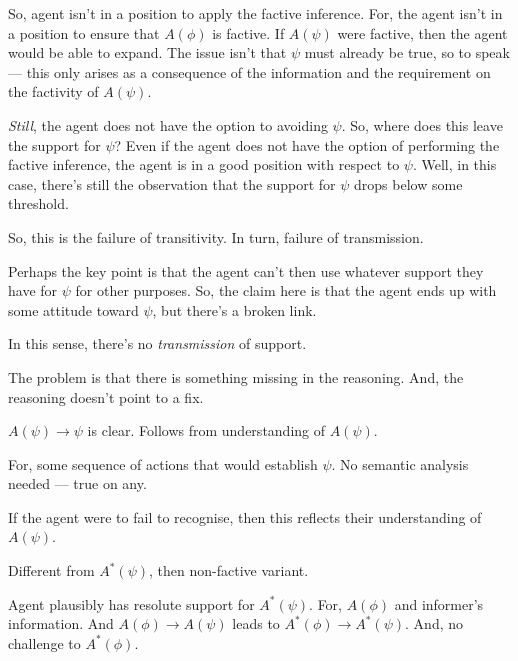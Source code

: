 \documentclass[10pt]{article}
\begin{document}
\begin{note}
  So, agent isn't in a position to apply the factive inference.
  For, the agent isn't in a position to ensure that \(A(\phi)\) is factive.
  If \(A(\psi)\) were factive, then the agent would be able to expand.
  The issue isn't that \(\psi\) must already be true, so to speak --- this only arises as a consequence of the information and the requirement on the factivity of \(A(\psi)\).

  \emph{Still}, the agent does not have the option to avoiding \(\psi\).
  So, where does this leave the support for \(\psi\)?
  Even if the agent does not have the option of performing the factive inference, the agent is in a good position with respect to \(\psi\).
  Well, in this case, there's still the observation that the support for \(\psi\) drops below some threshold.

  So, this is the failure of transitivity.
  In turn, failure of transmission.

  Perhaps the key point is that the agent can't then use whatever support they have for \(\psi\) for other purposes.
  So, the claim here is that the agent ends up with some attitude toward \(\psi\), but there's a broken link.

  In this sense, there's no \emph{transmission} of support.

  The problem is that there is something missing in the reasoning.
  And, the reasoning doesn't point to a fix.
\end{note}

\begin{note}
  \(A(\psi) \rightarrow \psi\) is clear.
  Follows from understanding of \(A(\psi)\).

  For, some sequence of actions that would establish \(\psi\).
  No semantic analysis needed --- true on any.

  If the agent were to fail to recognise, then this reflects their understanding of \(A(\psi)\).

  Different from \(A^{*}(\psi)\), then non-factive variant.

  Agent plausibly has resolute support for \(A^{*}(\psi)\).
  For, \(A(\phi)\) and informer's information.
  And \(A(\phi) \rightarrow A(\psi)\) leads to \(A^{*}(\phi) \rightarrow A^{*}(\psi)\).
  And, no challenge to \(A^{*}(\phi)\).
\end{note}
\end{document}
